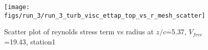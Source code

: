 \begin{figure}[H]
\centering
\texttt{[image: figs/run\_3/run\_3\_turb\_visc\_ettap\_top\_vs\_r\_mesh\_scatter]}
\caption{Scatter plot of reynolds stress term vs radius at $z/c$=5.37, $V_{free}$=19.43, station1}
\label{fig:run_3_turb_visc_ettap_top_vs_r_mesh_scatter}
\end{figure}


